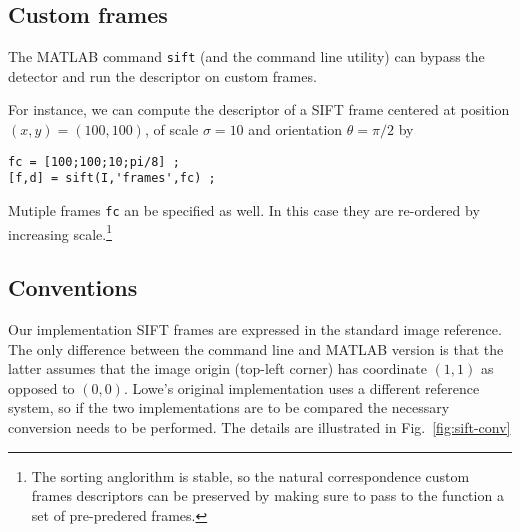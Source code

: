 \documentclass{article}
\begin{document}
\subsection{Custom frames}\label{sift.custom}

The MATLAB command \verb$sift$ (and the command line utility) can
bypass the detector and run the descriptor on custom frames.


For instance, we can compute the descriptor of a SIFT frame centered
at position $(x,y)=(100,100)$, of scale $\sigma=10$ and orientation
$\theta=\pi/2$ by
\begin{verbatim}
fc = [100;100;10;pi/8] ;
[f,d] = sift(I,'frames',fc) ;
\end{verbatim}
Mutiple frames \verb$fc$ an be specified as well. In this case they
are re-ordered by increasing scale.\footnote{The sorting anglorithm is
  stable, so the natural correspondence custom frames descriptors can
  be preserved by making sure to pass to the function a set of
  pre-predered frames.}


\subsection{Conventions}\label{sift.conventions}

Our implementation SIFT frames are expressed in the standard image
reference.  The only difference between the command line and MATLAB
version is that the latter assumes that the image origin (top-left
corner) has coordinate $(1,1)$ as opposed to $(0,0)$. Lowe's original
implementation uses a different reference system, so if the two implementations
are to be compared the necessary conversion needs to be performed.
The details are illustrated in Fig.~\ref{fig:sift-conv}
\end{document}

